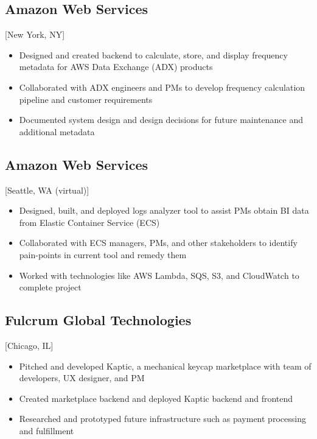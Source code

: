 \documentclass{mycv}
\begin{document}
\subsection{Amazon Web Services}[New York, NY]
\begin{positions}
\end{positions}
\begin{itemize}
  \item Designed and created backend to calculate, store, and display frequency metadata for AWS Data Exchange (ADX) products
  \item Collaborated with ADX engineers and PMs to develop frequency calculation pipeline and customer requirements
  \item Documented system design and design decisions for future maintenance and additional metadata
\end{itemize}

\subsection{Amazon Web Services}[Seattle, WA (virtual)]
\begin{positions}
\end{positions}
\begin{itemize}
  \item Designed, built, and deployed logs analyzer tool to assist PMs obtain BI data from Elastic Container Service (ECS)
  \item Collaborated with ECS managers, PMs, and other stakeholders to identify pain-points in current tool and remedy them
  \item Worked with technologies like AWS Lambda, SQS, S3, and CloudWatch to complete project
\end{itemize}

\subsection{Fulcrum Global Technologies}[Chicago, IL]
\begin{positions}
\end{positions}
\begin{itemize}
  \item Pitched and developed Kaptic, a mechanical keycap marketplace with team of developers, UX designer, and PM
  \item Created marketplace backend and deployed Kaptic backend and frontend
  \item Researched and prototyped future infrastructure such as payment processing and fulfillment
\end{itemize}
\end{document}
